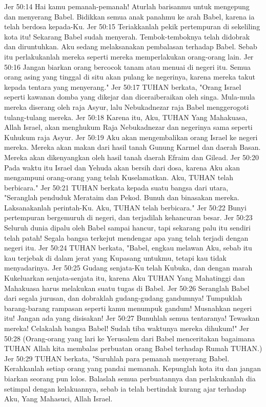 Jer 50:14  Hai kamu pemanah-pemanah! Aturlah barisanmu untuk mengepung dan menyerang Babel. Bidikkan semua anak panahmu ke arah Babel, karena ia telah berdosa kepada-Ku.
Jer 50:15  Teriakkanlah pekik pertempuran di sekeliling kota itu! Sekarang Babel sudah menyerah. Tembok-temboknya telah didobrak dan diruntuhkan. Aku sedang melaksanakan pembalasan terhadap Babel. Sebab itu perlakukanlah mereka seperti mereka memperlakukan orang-orang lain.
Jer 50:16  Jangan biarkan orang bercocok tanam atau menuai di negeri itu. Semua orang asing yang tinggal di situ akan pulang ke negerinya, karena mereka takut kepada tentara yang menyerang."
Jer 50:17  TUHAN berkata, "Orang Israel seperti kawanan domba yang dikejar dan diceraiberaikan oleh singa. Mula-mula mereka diserang oleh raja Asyur, lalu Nebukadnezar raja Babel menggerogoti tulang-tulang mereka.
Jer 50:18  Karena itu, Aku, TUHAN Yang Mahakuasa, Allah Israel, akan menghukum Raja Nebukadnezar dan negerinya sama seperti Kuhukum raja Asyur.
Jer 50:19  Aku akan mengembalikan orang Israel ke negeri mereka. Mereka akan makan dari hasil tanah Gunung Karmel dan daerah Basan. Mereka akan dikenyangkan oleh hasil tanah daerah Efraim dan Gilead.
Jer 50:20  Pada waktu itu Israel dan Yehuda akan bersih dari dosa, karena Aku akan mengampuni orang-orang yang telah Kuselamatkan. Aku, TUHAN telah berbicara."
Jer 50:21  TUHAN berkata kepada suatu bangsa dari utara, "Seranglah penduduk Merataim dan Pekod. Bunuh dan binasakan mereka. Laksanakanlah perintah-Ku. Aku, TUHAN telah berbicara."
Jer 50:22  Bunyi pertempuran bergemuruh di negeri, dan terjadilah kehancuran besar.
Jer 50:23  Seluruh dunia dipalu oleh Babel sampai hancur, tapi sekarang palu itu sendiri telah patah! Segala bangsa terkejut mendengar apa yang telah terjadi dengan negeri itu.
Jer 50:24  TUHAN berkata, "Babel, engkau melawan Aku, sebab itu kau terjebak di dalam jerat yang Kupasang untukmu, tetapi kau tidak menyadarinya.
Jer 50:25  Gudang senjata-Ku telah Kubuka, dan dengan marah Kukeluarkan senjata-senjata itu, karena Aku TUHAN Yang Mahatinggi dan Mahakuasa harus melakukan suatu tugas di Babel.
Jer 50:26  Seranglah Babel dari segala jurusan, dan dobraklah gudang-gudang gandumnya! Tumpuklah barang-barang rampasan seperti kamu menumpuk gandum! Musnahkan negeri itu! Jangan ada yang disisakan!
Jer 50:27  Bunuhlah semua tentaranya! Tewaskan mereka! Celakalah bangsa Babel! Sudah tiba waktunya mereka dihukum!"
Jer 50:28  (Orang-orang yang lari ke Yerusalem dari Babel menceritakan bagaimana TUHAN Allah kita membalas perbuatan orang Babel terhadap Rumah TUHAN.)
Jer 50:29  TUHAN berkata, "Suruhlah para pemanah menyerang Babel. Kerahkanlah setiap orang yang pandai memanah. Kepunglah kota itu dan jangan biarkan seorang pun lolos. Balaslah semua perbuatannya dan perlakukanlah dia setimpal dengan kelakuannya, sebab ia telah bertindak kurang ajar terhadap Aku, Yang Mahasuci, Allah Israel.
